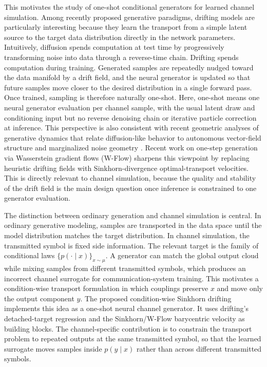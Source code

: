 \documentclass[10pt,journal]{IEEEtran}
\begin{document}
This motivates the study of one-shot conditional generators for learned channel simulation.
Among recently proposed generative paradigms, drifting models \cite{drifting} are particularly interesting because they learn the transport from a simple latent source to the target data distribution directly in the network parameters.
Intuitively, diffusion spends computation at test time by progressively transforming noise into data through a reverse-time chain.
Drifting spends computation during training.
Generated samples are repeatedly nudged toward the data manifold by a drift field, and the neural generator is updated so that future samples move closer to the desired distribution in a single forward pass.
Once trained, sampling is therefore naturally one-shot.
Here, one-shot means one neural generator evaluation per channel sample, with the usual latent draw and conditioning input but no reverse denoising chain or iterative particle correction at inference.
This perspective is also consistent with recent geometric analyses of generative dynamics that relate diffusion-like behavior to autonomous vector-field structure and marginalized noise geometry \cite{geometryofnoise}.
Recent work on one-step generation via Wasserstein gradient flows (W-Flow) \cite{han2026wflow} sharpens this viewpoint by replacing heuristic drifting fields with Sinkhorn-divergence optimal-transport velocities.
This is directly relevant to channel simulation, because the quality and stability of the drift field is the main design question once inference is constrained to one generator evaluation.

The distinction between ordinary generation and channel simulation is central.
In ordinary generative modeling, samples are transported in the data space until the model distribution matches the target distribution.
In channel simulation, the transmitted symbol is fixed side information.
The relevant target is the family of conditional laws \(\{p(\cdot\mid x)\}_{x\sim\mu}\).
A generator can match the global output cloud while mixing samples from different transmitted symbols, which produces an incorrect channel surrogate for communication-system training.
This motivates a condition-wise transport formulation in which couplings preserve \(x\) and move only the output component \(y\).
The proposed condition-wise Sinkhorn drifting implements this idea as a one-shot neural channel generator.
It uses drifting's detached-target regression and the Sinkhorn/W-Flow barycentric velocity as building blocks.
The channel-specific contribution is to constrain the transport problem to repeated outputs at the same transmitted symbol, so that the learned surrogate moves samples inside \(p(y\mid x)\) rather than across different transmitted symbols.
\end{document}
